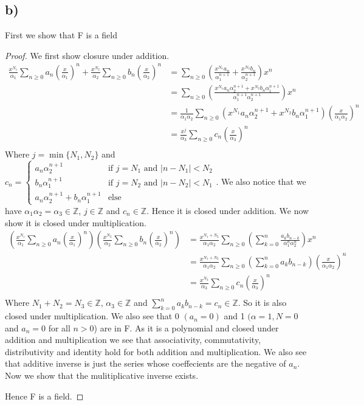 \documentclass{article}
\theoremstyle{definition}
\begin{document}
\subsection*{b)}
First we show that F is a field
\begin{proof}
We first show closure under addition.
\begin{align*}
\frac{x^{N_1}}{\alpha_1}\sum_{n\geq0}a_n\left(\frac{x}{\alpha_1}\right)^n+\frac{x^{N_2}}{\alpha_2}\sum_{n\geq0}b_n\left(\frac{x}{\alpha_2}\right)^n&=\sum_{n\geq0}\left(\frac{x^{N_1}a_n}{\alpha_{1}^{n+1}}+\frac{x^{N_2}b_n}{\alpha_2^{n+1}}\right)x^n\\
&=\sum_{n\geq0}\left(\frac{x^{N_1}a_n\alpha_2^{n+1}+x^{N_2}b_n\alpha_{1}^{n+1}}{\alpha_{1}^{n+1}\alpha_2^{n+1}}\right)x^n\\
&=\frac{1}{\alpha_1\alpha_2}\sum_{n\geq0}\left(x^{N_1}a_n\alpha_2^{n+1}+x^{N_2}b_n\alpha_{1}^{n+1}\right)\left(\frac{x}{\alpha_{1}\alpha_2}\right)^n\\
&=\frac{x^{j}}{\alpha_3}\sum_{n\geq0}c_n\left(\frac{x}{\alpha_{3}}\right)^n\\
\end{align*}
Where $j=\min\{N_1,N_2\}$ and $c_n=\begin{cases}
a_n\alpha_2^{n+1} & \text{if } j=N_1 \text{ and } |n-N_1|<N_2\\
b_n\alpha_1^{n+1} & \text{if } j=N_2 \text{ and } |n-N_2|<N_1\\
a_n\alpha_2^{n+1}+b_n\alpha_1^{n+1} & \text{else}
\end{cases}
$. We also notice that we have $\alpha_1\alpha_2=\alpha_3\in\mathbb{Z}$, $j\in\mathbb{Z}$ and $c_n\in\mathbb{Z}$. Hence it is closed under addition. We now show it is closed under multiplication.
\begin{align*}
\left(\frac{x^{N_1}}{\alpha_1}\sum_{n\geq0}a_n\left(\frac{x}{\alpha_1}\right)^n\right)\left(\frac{x^{N_2}}{\alpha_2}\sum_{n\geq0}b_n\left(\frac{x}{\alpha_2}\right)^n\right)&=\frac{x^{N_1+N_2}}{\alpha_1\alpha_2}\sum_{n\geq0}\left(\sum_{k=0}^{n}\frac{a_kb_{n-k}}{\alpha_1^n\alpha_2^n}\right)x^n\\
&=\frac{x^{N_1+N_2}}{\alpha_1\alpha_2}\sum_{n\geq0}\left(\sum_{k=0}^{n}a_kb_{n-k}\right)\left(\frac{x}{\alpha_1\alpha_2}\right)^n\\
&=\frac{x^{N_3}}{\alpha_3}\sum_{n\geq0}c_n\left(\frac{x}{\alpha_3}\right)^n\\
\end{align*}
Where $N_1+N_2=N_3\in\mathbb{Z}$, $\alpha_3\in\mathbb{Z}$ and $\sum_{k=0}^{n}a_kb_{n-k}=c_n\in\mathbb{Z}$. So it is also closed under multiplication. We also see that 0 $(a_n=0)$ and 1 $(\alpha=1,N=0$ and $a_n=0$ for all $n>0$) are in F. As it is a polynomial and closed under addition and multiplication we see that associativity, commutativity, distributivity and identity hold for both addition and multiplication. We also see that additive inverse is just the series whose coeffecients are the negative of $a_n$. Now we show that the mulitiplicative inverse exists. 


Hence F is a field.
\end{proof}
\end{document}
